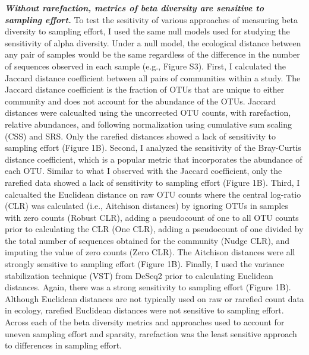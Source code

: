 \documentclass[
]{article}
\begin{document}
\textbf{\emph{Without rarefaction, metrics of beta diversity are
sensitive to sampling effort.}} To test the sesitivity of various
approaches of measuring beta diversity to sampling effort, I used the
same null models used for studying the sensitivity of alpha diversity.
Under a null model, the ecological distance between any pair of samples
would be the same regardless of the difference in the number of
sequences observed in each sample (e.g., Figure S3). First, I calculated
the Jaccard distance coefficient between all pairs of communities within
a study. The Jaccard distance coefficient is the fraction of OTUs that
are unique to either community and does not account for the abundance of
the OTUs. Jaccard distances were calcualted using the uncorrected OTU
counts, with rarefaction, relative abundances, and following
normalization using cumulative sum scaling (CSS) and SRS. Only the
rarefied distances showed a lack of sensitivity to sampling effort
(Figure 1B). Second, I analyzed the sensitivity of the Bray-Curtis
distance coefficient, which is a popular metric that incorporates the
abundance of each OTU. Similar to what I observed with the Jaccard
coefficient, only the rarefied data showed a lack of sensitivity to
sampling effort (Figure 1B). Third, I calcualted the Euclidean distance
on raw OTU counts where the central log-ratio (CLR) was calculated
(i.e., Aitchison distances) by ignoring OTUs in samples with zero counts
(Robust CLR), adding a pseudocount of one to all OTU counts prior to
calculating the CLR (One CLR), adding a pseudocount of one divided by
the total number of sequences obtained for the community (Nudge CLR),
and imputing the value of zero counts (Zero CLR). The Aitchison
distances were all strongly sensitive to sampling effort (Figure 1B).
Finally, I used the variance stabilization technique (VST) from DeSeq2
prior to calculating Euclidean distances. Again, there was a strong
sensitivity to sampling effort (Figure 1B). Although Euclidean distances
are not typically used on raw or rarefied count data in ecology,
rarefied Euclidean distances were not sensitive to sampling effort.
Across each of the beta diversity metrics and approaches used to account
for uneven sampling effort and sparsity, rarefaction was the least
sensitive approach to differences in sampling effort.
\end{document}
